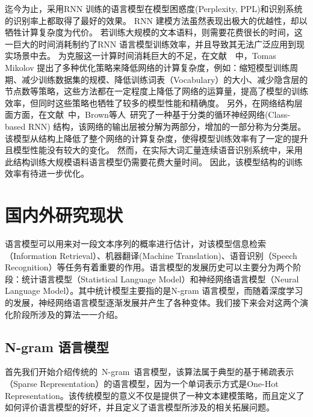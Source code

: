 迄今为止，采用RNN 训练的语言模型在模型困惑度(Perplexity, PPL)和识别系统的识别率上都取得了最好的效果。 RNN 建模方法虽然表现出极大的优越性，却以牺牲计算复杂度为代价。 若训练大规模的文本语料，则需要花费很长的时间，这一巨大的时间消耗制约了RNN 语言模型训练效率，并且导致其无法广泛应用到现实场景中去。 为克服这一计算时间消耗巨大的不足，在文献~\cite{DBLP:conf/icassp/MikolovKBCK11}~中，Tomas Mikolov 提出了多种优化策略来降低网络的计算复杂度，例如：缩短模型训练周期、减少训练数据集的规模、降低训练词表（Vocabulary）的大小、减少隐含层的节点数等策略，这些方法都在一定程度上降低了网络的运算量，提高了模型的训练效率，但同时这些策略也牺牲了较多的模型性能和精确度。 另外，在网络结构层面方面，在文献~\cite{DBLP:journals/coling/BrownPdLM92}中，Brown等人~研究了一种基于分类的循环神经网络(Class-based RNN) 结构，该网络的输出层被分解为两部分，增加的一部分称为分类层。该模型从结构上降低了整个网络的计算复杂度，使得模型训练效率有了一定的提升且模型性能没有较大的变化。 然而，在实际大词汇量连续语音识别系统中，采用此结构训练大规模语料语言模型仍需要花费大量时间。 因此，该模型结构的训练效率有待进一步优化。

\section{国内外研究现状}
语言模型可以用来对一段文本序列的概率进行估计，对该模型信息检索（Information Retrieval）、机器翻译(Machine Translation)、语音识别（Speech Recognition）等任务有着重要的作用。语言模型的发展历史可以主要分为两个阶段：统计语言模型（Statistical Language Model）和神经网络语言模型（Neural Language Model）。其中统计模型主要指的是N-gram 语言模型，而随着深度学习的发展，神经网络语言模型逐渐发展并产生了各种变体。我们接下来会对这两个演化阶段所涉及的算法一一介绍。

\subsection{N-gram 语言模型}
首先我们开始介绍传统的~N-gram~语言模型，该算法属于典型的基于稀疏表示（Sparse Representation）的语言模型，因为一个单词表示方式是One-Hot Representation。该传统模型的意义不仅是提供了一种文本建模策略，而且定义了如何评价语言模型的好坏，并且定义了语言模型所涉及的相关拓展问题。

